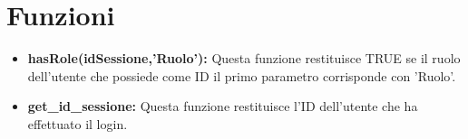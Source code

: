 \documentclass[a4paper, 12pt]{report}
\begin{document}
        \section{Funzioni}
            \begin{itemize}
                \item \textbf{hasRole(idSessione,'Ruolo'):} Questa funzione restituisce TRUE se il ruolo dell'utente che possiede come ID il primo parametro corrisponde con 'Ruolo'.
                \item \textbf{get\_id\_sessione:} Questa funzione restituisce l'ID dell'utente che ha effettuato il login.
            \end{itemize}
\end{document}

